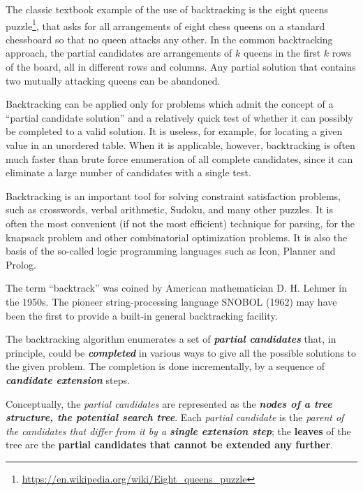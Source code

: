 The classic textbook example of the use of backtracking is the eight queens
puzzle\footnote{\url{https://en.wikipedia.org/wiki/Eight\_queens\_puzzle}},
that asks for all arrangements of eight chess queens on a standard
chessboard so that no queen attacks any other. In the common backtracking
approach, the partial candidates are arrangements of $k$ queens in the first
$k$ rows of the board, all in different rows and columns. Any partial
solution that contains two mutually attacking queens can be abandoned.

Backtracking can be applied only for problems which admit the concept of a
``partial candidate solution'' and a relatively quick test of whether it can
possibly be completed to a valid solution. It is useless, for example, for
locating a given value in an unordered table. When it is applicable,
however, backtracking is often much faster than brute force enumeration of
all complete candidates, since it can eliminate a large number of candidates
with a single test.

Backtracking is an important tool for solving constraint satisfaction
problems, such as crosswords, verbal arithmetic, Sudoku, and many other
puzzles. It is often the most convenient (if not the most efficient)
technique for parsing, for the knapsack problem and other combinatorial
optimization problems. It is also the basis of the so-called logic
programming languages such as Icon, Planner and Prolog.

The term ``backtrack'' was coined by American mathematician D. H. Lehmer in
the 1950s. The pioneer string-processing language SNOBOL (1962) may have
been the first to provide a built-in general backtracking facility.


The backtracking algorithm enumerates a set of \textbf{\emph{partial
    candidates}} that, in principle, could be \textbf{\emph{completed}} in
various ways to give all the possible solutions to the given problem. The
completion is done incrementally, by a sequence of \textbf{\emph{candidate
    extension}} steps.

Conceptually, the \emph{partial candidates} are represented as the
\textbf{\emph{nodes of a tree structure, the potential search tree}}. Each
\emph{partial candidate} is the \emph{parent of the candidates that differ
  from it by a \textbf{single extension step}}; the \textbf{leaves} of the
tree are the \textbf{partial candidates that cannot be extended any
  further}.

